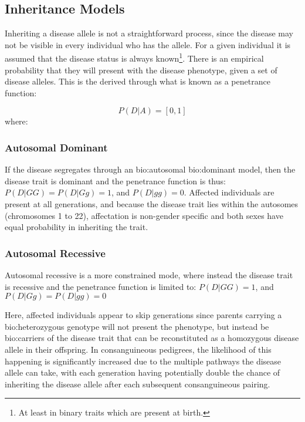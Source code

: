 \subsection{Inheritance Models}

Inheriting a disease allele is not a straightforward process, since the disease may not be visible in every individual who has the allele. For a given individual it is assumed that the disease status is always known\footnote{At least in binary traits which are present at birth.}.  There is an empirical probability that they will present with the disease phenotype, given a set of disease alleles. This is the derived through what is known as a penetrance function:

\begin{equation}
P (D | A) = [0,1]
\end{equation}
where:
\begin{description}
\end{description}


\subsubsection{Autosomal Dominant}

If the disease segregates through an \gls{bio:autosomal} \gls{bio:dominant} model, then the disease trait is dominant and the penetrance function is thus:  \(P(D|GG) = P(D|Gg) = 1\), and \(P(D|gg)=0\).
Affected individuals are present at all generations, and because the disease trait lies within the autosomes (chromosomes 1 to 22), affectation is non-gender specific and both sexes have equal probability in inheriting the trait.

\subsubsection{Autosomal Recessive}

Autosomal recessive is a more constrained mode, where instead the disease trait is recessive and the penetrance function is limited to: \(P(D|GG)=1\), and \(P(D|Gg) = P(D|gg) = 0\)

Here, affected individuals appear to skip generations since parents carrying a \gls{bio:heterozygous} genotype will not present the phenotype, but instead be \gls{bio:carriers} of the disease trait that can be reconstituted as a homozygous disease allele in their offspring. In consanguineous pedigrees, the likelihood of this happening is significantly increased due to the multiple pathways the disease allele can take, with each generation having potentially double the chance of inheriting the disease allele after each subsequent consanguineous pairing.

